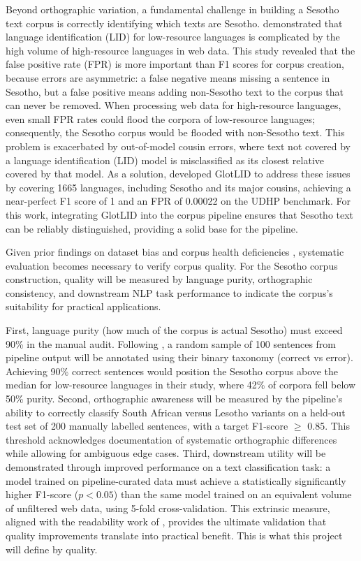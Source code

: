 \documentclass[12pt]{ThesisRU}
\begin{document}
Beyond orthographic variation, a fundamental challenge in building a Sesotho text corpus is correctly identifying which texts are Sesotho. \citet{kargaran2023glotlid} demonstrated that language identification (LID) for low-resource languages is complicated by the high volume of high-resource languages in web data. This study revealed that the false positive rate (FPR) is more important than F1 scores for corpus creation, because errors are asymmetric: a false negative means missing a sentence in Sesotho, but a false positive means adding non-Sesotho text to the corpus that can never be removed. When processing web data for high-resource languages, even small FPR rates could flood the corpora of low-resource languages; consequently, the Sesotho corpus would be flooded with non-Sesotho text. This problem is exacerbated by out-of-model cousin errors, where text not covered by a language identification (LID) model is misclassified as its closest relative covered by that model. As a solution, \citet{kargaran2023glotlid} developed GlotLID to address these issues by covering 1665 languages, including Sesotho and its major cousins, achieving a near-perfect F1 score of 1 and an FPR of 0.00022 on the UDHP benchmark. For this work, integrating GlotLID into the corpus pipeline ensures that Sesotho text can be reliably distinguished, providing a solid base for the pipeline.


\vspace{1em}
Given prior findings on dataset bias and corpus health deficiencies \citep{Mishra2020,Adebara2022}, systematic evaluation becomes necessary to verify corpus quality. For the Sesotho corpus construction, quality will be measured by language purity, orthographic consistency, and downstream NLP task performance to indicate the corpus's suitability for practical applications.
\vspace{1em}

First, language purity (how much of the corpus is actual Sesotho) must exceed 90\% in the manual audit. Following \citet{kreutzer-etal-2022-quality}, a random sample of 100 sentences from pipeline output will be annotated using their binary taxonomy (correct vs error). Achieving 90\% correct sentences would position the Sesotho corpus above the median for low-resource languages in their study, where 42\% of corpora fell below 50\% purity. Second, orthographic awareness will be measured by the pipeline's ability to correctly classify South African versus Lesotho variants on a held-out test set of 200 manually labelled sentences, with a target F1-score $\geq$ 0.85. This threshold acknowledges \citet{Makutoane2022} documentation of systematic orthographic differences while allowing for ambiguous edge cases. Third, downstream utility will be demonstrated through improved performance on a text classification task: a model trained on pipeline-curated data must achieve a statistically significantly higher F1-score ($p < 0.05$) than the same model trained on an equivalent volume of unfiltered web data, using 5-fold cross-validation. This extrinsic measure, aligned with the readability work of \citep{Sibeko2024}, provides the ultimate validation that quality improvements translate into practical benefit. This is what this project will define by quality.
\end{document}
